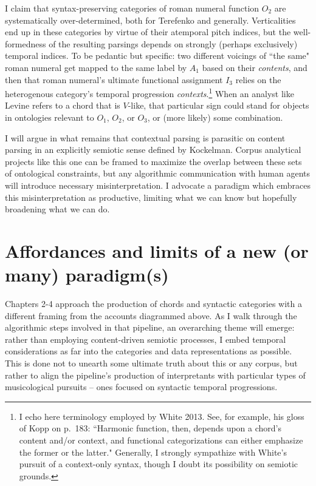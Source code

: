 I claim that syntax-preserving categories of roman numeral function $O_2$ are systematically over-determined, both for Terefenko and generally.  Verticalities end up in these categories by virtue of their atemporal pitch indices, but the well-formedness of the resulting parsings depends on strongly (perhaps exclusively) temporal indices.  To be pedantic but specific: two different voicings of ``the same" roman numeral get mapped to the same label by $A_1$ based on their \emph{contents}, and then that roman numeral's ultimate functional assignment $I_3$ relies on the heterogenous category's temporal progression \emph{contexts}.\footnote{I echo here terminology employed by White 2013.  See, for example, his gloss of Kopp on p.\ 183: ``Harmonic function, then, depends upon a chord's content and/or context, and functional categorizations can either emphasize the former or the latter."  Generally, I strongly sympathize with White's pursuit of a context-only syntax, though I doubt its possibility on semiotic grounds.}  When an analyst like Levine refers to a chord that is $V$-like, that particular sign could stand for objects in ontologies relevant to $O_1$, $O_2$, or $O_3$, or (more likely) some combination.

I will argue in what remains that contextual parsing is parasitic on content parsing in an explicitly semiotic sense defined by Kockelman.  Corpus analytical projects like this one can be framed to maximize the overlap between these sets of ontological constraints, but any algorithmic communication with human agents will introduce necessary misinterpretation.  I advocate a paradigm which embraces this misinterpretation as productive, limiting what we can know but hopefully broadening what we can do.

\section{Affordances and limits of a new (or many) paradigm(s)}

Chapters 2-4 approach the production of chords and syntactic categories with a different framing from the accounts diagrammed above.  As I walk through the algorithmic steps involved in that pipeline, an overarching theme will emerge: rather than employing content-driven semiotic processes, I embed temporal considerations as far into the categories and data representations as possible.  This is done not to unearth some ultimate truth about this or any corpus, but rather to align the pipeline's production of interpretants with particular types of musicological pursuits -- ones focused on syntactic temporal progressions.  

